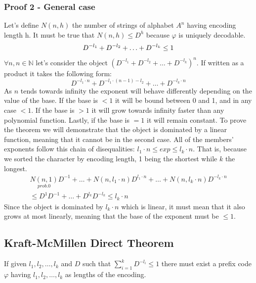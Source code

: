     \subsubsection{Proof 2 - General case}
    Let's define $N(n,h)$ the number of strings of alphabet $A^n$ having encoding length h. It must be true that $N(n,h)\leq D^h$ because $\varphi$ is uniquely decodable.
    \begin{equation}
        D^{-l_1}+D^{-l_2}+\ldots+D^{-l_k}\leq 1 \\
    \end{equation}
    $\forall n, n\in\mathbb{N}$ let's consider the object $(D^{-l_1}+D^{-l_2}+\ldots+D^{-l_k})^n$. If written as a product it takes the following form:
    $$D^{-l_1\cdot n}+D^{-l_1\cdot(n-1)-l_2}+\ldots+D^{-l_k\cdot n}$$
    As $n$ tends towards infinity the exponent will behave differently depending on the value of the base. If the base is $<1$ it will be bound between 0 and 1, and in any case $<1$. If the base is $>1$ it will grow towards infinity faster than any polynomial function. Lastly, if the base is $=1$ it will remain constant. To prove the theorem we will demonstrate that the object is dominated by a linear function, meaning that it cannot be in the second case. 
    All of the members' exponents follow this chain of disequalities: $l_1\cdot n\leq exp\leq l_k\cdot n$. That is, because we sorted the character by encoding length, 1 being the shortest while $k$ the longest.
    \begin{align*}
        \underset{prob. 0}{N(n,1)}D^{-1}+\ldots+N(n,l_1\cdot n)D^{l_1\cdot n}+\ldots+N(n,l_k\cdot n)D^{-l_k\cdot n}\\\leq D^1D^{-1}+\ldots+D^{l_k}D^{-l_k} \leq l_k\cdot n
    \end{align*}
    Since the object is dominated by $l_k\cdot n$ which is linear, it must mean that it also grows at most linearly, meaning that the base of the exponent must be $\leq 1$.
    \subsection{Kraft-McMillen Direct Theorem}
    If given $l_1,l_2,\ldots,l_k$ and $D$ such that $\sum_{i=1}^{k}{D^{-l_i}}\leq 1$ there must exist a prefix code $\varphi$ having $l_1,l_2,\ldots,l_k$ as lengths of the encoding.
